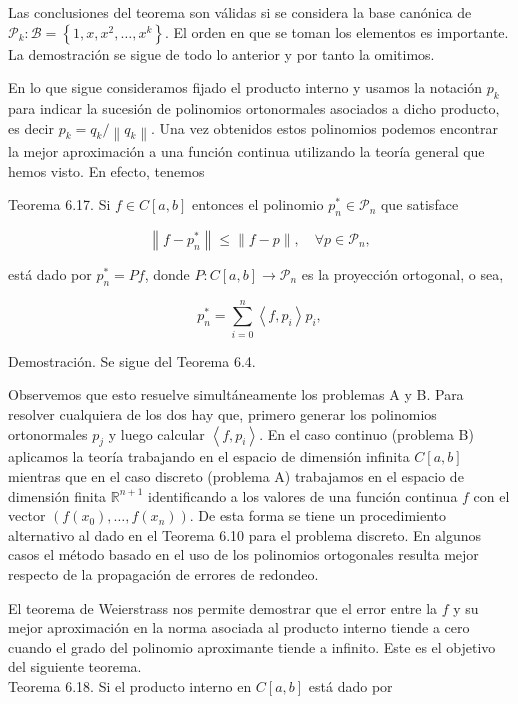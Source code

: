 \documentclass[10pt]{book}
\begin{document}
Las conclusiones del teorema son válidas si se considera la base canónica de $\mathcal{P}_{k}: \mathcal{B}=\left\{1, x, x^{2}, \ldots, x^{k}\right\}$. El orden en que se toman los elementos es importante. La demostración se sigue de todo lo anterior y por tanto la omitimos.

En lo que sigue consideramos fijado el producto interno y usamos la notación $p_{k}$ para indicar la sucesión de polinomios ortonormales asociados a dicho producto, es decir $p_{k}=q_{k} /\left\|q_{k}\right\|$. Una vez obtenidos estos polinomios podemos encontrar la mejor aproximación a una función continua utilizando la teoría general que hemos visto. En efecto, tenemos

Teorema 6.17. Si $f \in C[a, b]$ entonces el polinomio $p_{n}^{*} \in \mathcal{P}_{n}$ que satisface

$$
\left\|f-p_{n}^{*}\right\| \leq\|f-p\|, \quad \forall p \in \mathcal{P}_{n},
$$

está dado por $p_{n}^{*}=P f$, donde $P: C[a, b] \longrightarrow \mathcal{P}_{n}$ es la proyección ortogonal, o sea,

$$
p_{n}^{*}=\sum_{i=0}^{n}\left\langle f, p_{i}\right\rangle p_{i},
$$

Demostración. Se sigue del Teorema 6.4.

Observemos que esto resuelve simultáneamente los problemas A y B. Para resolver cualquiera de los dos hay que, primero generar los polinomios ortonormales $p_{j}$ y luego calcular $\left\langle f, p_{i}\right\rangle$. En el caso continuo (problema B) aplicamos la teoría trabajando en el espacio de dimensión infinita $C[a, b]$ mientras que en el caso discreto (problema A) trabajamos en el espacio de dimensión finita $\mathbb{R}^{n+1}$ identificando a los valores de una función continua $f$ con el vector $\left(f\left(x_{0}\right), \ldots, f\left(x_{n}\right)\right)$. De esta forma se tiene un procedimiento alternativo al dado en el Teorema 6.10 para el problema discreto. En algunos casos el método basado en el uso de los polinomios ortogonales resulta mejor respecto de la propagación de errores de redondeo.

El teorema de Weierstrass nos permite demostrar que el error entre la $f$ y su mejor aproximación en la norma asociada al producto interno tiende a cero cuando el grado del polinomio aproximante tiende a infinito. Este es el objetivo del siguiente teorema.\\
Teorema 6.18. Si el producto interno en $C[a, b]$ está dado por
\end{document}
